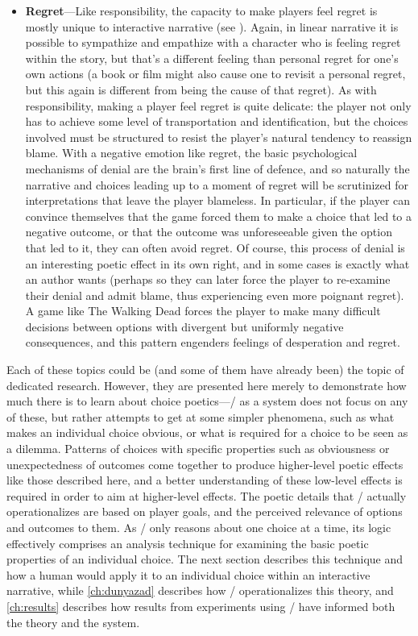 \begin{itemize}
  \item \textbf{Regret}---Like responsibility, the capacity to make players feel regret is mostly unique to interactive narrative (see \citep{Frome2006,Zagal2009}).
%
Again, in linear narrative it is possible to sympathize and empathize with a character who is feeling regret within the story, but that's a different feeling than personal regret for one's own actions (a book or film might also cause one to revisit a personal regret, but this again is different from being the cause of that regret).
%
As with responsibility, making a player feel regret is quite delicate: the player not only has to achieve some level of transportation and identification, but the choices involved must be structured to resist the player's natural tendency to reassign blame.
%
With a negative emotion like regret, the basic psychological mechanisms of denial are the brain's first line of defence, and so naturally the narrative and choices leading up to a moment of regret will be scrutinized for interpretations that leave the player blameless.
%
In particular, if the player can convince themselves that the game forced them to make a choice that led to a negative outcome, or that the outcome was unforeseeable given the option that led to it, they can often avoid regret.
%
Of course, this process of denial is an interesting poetic effect in its own right, and in some cases is exactly what an author wants (perhaps so they can later force the player to re-examine their denial and admit blame, thus experiencing even more poignant regret).
%
A game like The Walking Dead \citep{TheWalkingDead} forces the player to make many difficult decisions between options with divergent but uniformly negative consequences, and this pattern engenders feelings of desperation and regret.

\end{itemize}


Each of these topics could be (and some of them have already been) the topic of dedicated research.
%
However, they are presented here merely to demonstrate how much there is to learn about choice poetics---\dunyazad/ as a system does not focus on any of these, but rather attempts to get at some simpler phenomena, such as what makes an individual choice obvious, or what is required for a choice to be seen as a dilemma.
%
Patterns of choices with specific properties such as obviousness or unexpectedness of outcomes come together to produce higher-level poetic effects like those described here, and a better understanding of these low-level effects is required in order to aim at higher-level effects.
%
The poetic details that \dunyazad/ actually operationalizes are based on player goals, and the perceived relevance of options and outcomes to them.
%
As \dunyazad/ only reasons about one choice at a time, its logic effectively comprises an analysis technique for examining the basic poetic properties of an individual choice.
%
The next section describes this technique and how a human would apply it to an individual choice within an interactive narrative, while \cref{ch:dunyazad} describes how \dunyazad/ operationalizes this theory, and \cref{ch:results} describes how results from experiments using \dunyazad/ have informed both the theory and the system.

